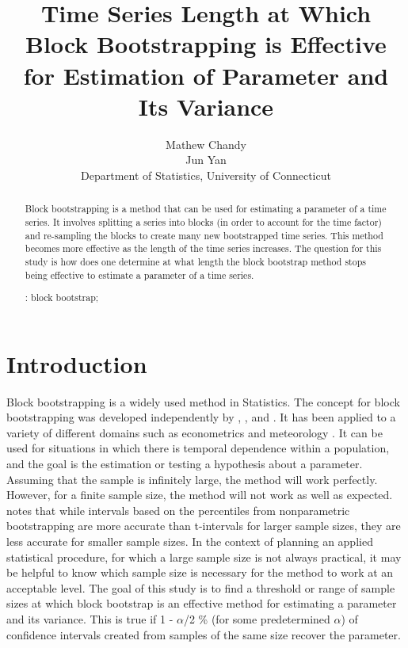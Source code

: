 \documentclass[12pt, letterpaper, titlepage]{article}
\title{Time Series Length at Which Block Bootstrapping is Effective for Estimation of Parameter and Its Variance}
\author{Mathew Chandy\\
  Jun Yan\\[1ex]
  Department of Statistics, University of Connecticut\\
}
\date{}
\begin{document}
 
\maketitle

\doublespace

\begin{abstract}
Block bootstrapping is a method that can be used for estimating a parameter of a time
series. It involves splitting a series into blocks (in order to account for the time
factor) and re-sampling the blocks to create many new bootstrapped time series.
This method becomes more effective as the length of the time series increases. 
The question for this study is how does one determine at what length the block
bootstrap method stops being effective to estimate a parameter of a time
series.

\bigskip
\noindent{}:
block bootstrap;
\end{abstract}

\section{Introduction}
\label{sec:intro}

Block bootstrapping is a widely used method in Statistics. The concept for block 
bootstrapping was developed independently by \citet{hall1985resampling}, \citet{carlstein1986use}, and 
\citet{kunsch1989jackknife}. \citet{radovanov2014comparison} It has been applied to a variety of 
different domains such 
as econometrics \citep{mackinnon2006bootstrap} and meteorology \citep{varga2017generalised}. It can be used for 
situations in which there is temporal dependence within a population, and the goal is the estimation or testing a hypothesis about a parameter. Assuming that the sample is infinitely 
large, the method will work perfectly. However, for a finite sample size, the method will 
not work as well as expected. \citet{hesterberg2015teachers} notes that while intervals based on the percentiles from nonparametric bootstrapping are more accurate than t-intervals for larger sample sizes, they are less accurate for smaller sample sizes. In the context of planning an applied 
statistical procedure, for which a large sample size is not always practical, it may be helpful to know which sample size is necessary for the method to work at an acceptable level. 
The goal of this study is to find a threshold or range of sample sizes at which block bootstrap 
is an effective method for estimating a parameter and its variance. This is true if 1 - $\alpha$/2 \% (for some predetermined $\alpha$) of confidence intervals created from samples of the same size recover the parameter.
\end{document}
